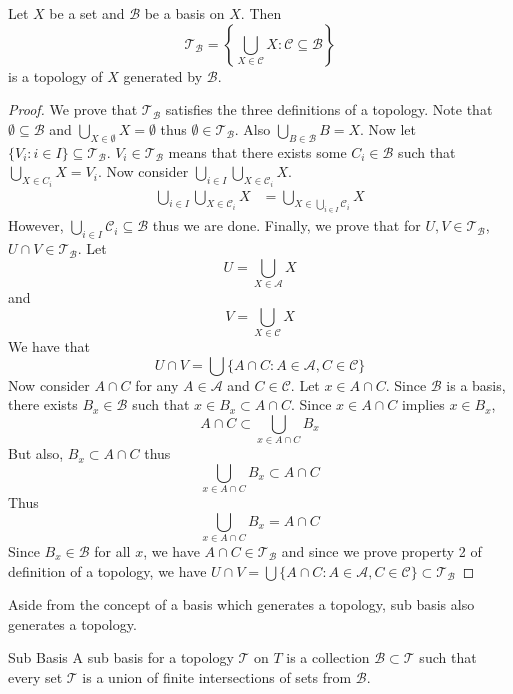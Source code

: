 \documentclass[a4paper]{article}
\begin{document}
\begin{prp}{}{} Let $X$ be a set and $\mathcal{B}$ be a basis on $X$. Then $$\mathcal{T}_\mathcal{B}=\left\{\bigcup_{X\in\mathcal{C}}X:\mathcal{C}\subseteq\mathcal{B}\right\}$$ is a topology of $X$ generated by $\mathcal{B}$. \tcbline
\begin{proof} We prove that $\mathcal{T}_\mathcal{B}$ satisfies the three definitions of a topology. Note that $\emptyset\subseteq\mathcal{B}$ and $\bigcup_{X\in\emptyset}X=\emptyset$ thus $\emptyset\in\mathcal{T}_\mathcal{B}$. Also $\bigcup_{B\in\mathcal{B}}B=X$. Now let $\{V_i:i\in I\}\subseteq\mathcal{T}_\mathcal{B}$. $V_i\in\mathcal{T}_\mathcal{B}$ means that there exists some $C_i\in\mathcal{B}$ such that $\bigcup_{X\in C_i}X=V_i$. Now consider $\bigcup_{i\in I}\bigcup_{X\in\mathcal{C}_i}X$. 
\begin{align*}
\bigcup_{i\in I}\bigcup_{X\in\mathcal{C}_i}X&=\bigcup_{X\in\bigcup_{i\in I}\mathcal{C}_i}X
\end{align*} However, $\bigcup_{i\in I}\mathcal{C}_i\subseteq\mathcal{B}$ thus we are done. Finally, we prove that for $U,V\in\mathcal{T}_\mathcal{B}$, $U\cap V\in\mathcal{T}_\mathcal{B}$. Let $$U=\bigcup_{X\in\mathcal{A}}X$$ and $$V=\bigcup_{X\in\mathcal{C}}X$$ We have that $$U\cap V=\bigcup\{A\cap C:A\in\mathcal{A}, C\in\mathcal{C}\}$$ Now consider $A\cap C$ for any $A\in\mathcal{A}$ and $C\in\mathcal{C}$. Let $x\in A\cap C$. Since $\mathcal{B}$ is a basis, there exists $B_x\in\mathcal{B}$ such that $x\in B_x\subset A\cap C$. Since $x\in A\cap C$ implies $x\in B_x$, $$A\cap C\subset\bigcup_{x\in A\cap C}B_x$$ But also, $B_x\subset A\cap C$ thus $$\bigcup_{x\in A\cap C}B_x\subset A\cap C$$ Thus $$\bigcup_{x\in A\cap C}B_x=A\cap C$$ Since $B_x\in\mathcal{B}$ for all $x$, we have $A\cap C\in\mathcal{T}_\mathcal{B}$ and since we prove property 2 of definition of a topology, we have $U\cap V=\bigcup\{A\cap C:A\in\mathcal{A}, C\in\mathcal{C}\}\subset\mathcal{T}_\mathcal{B}$
\end{proof}
\end{prp}

Aside from the concept of a basis which generates a topology, sub basis also generates a topology. 

\begin{defn}{Sub Basis}{} A sub basis for a topology $\mathcal{T}$ on $T$ is a collection $\mathcal{B}\subset\mathcal{T}$ such that every set $\mathcal{T}$ is a union of finite intersections of sets from $\mathcal{B}$. 
\end{defn}
\end{document}
